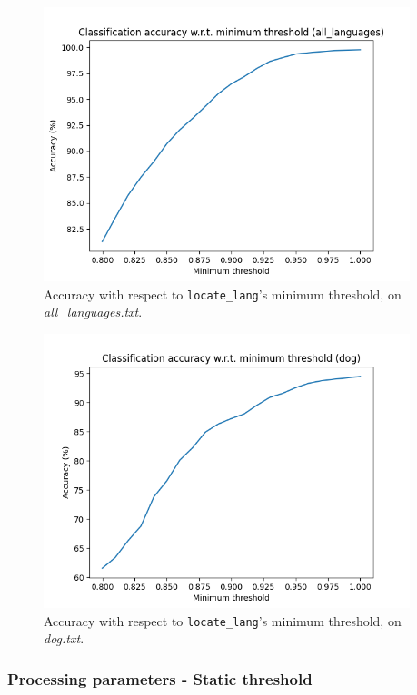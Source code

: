 \documentclass{article}
\begin{document}
\begin{figure}
    \centering
    \includegraphics[width=0.95\textwidth]{../results/all_languages/ll-m.png}
    \caption{Accuracy with respect to \texttt{locate\_lang}'s minimum threshold, on \textit{all\_languages.txt}.}
    \label{fig:ll_m_all_languages}
\end{figure}

\begin{figure}
    \centering
    \includegraphics[width=0.95\textwidth]{../results/dog/ll-m.png}
    \caption{Accuracy with respect to \texttt{locate\_lang}'s minimum threshold, on \textit{dog.txt}.}
    \label{fig:ll_m_dog}
\end{figure}

\subsubsection{Processing parameters - Static threshold}
\label{subsubsec:results_locate_lang_static_threshold_processing}
\end{document}
